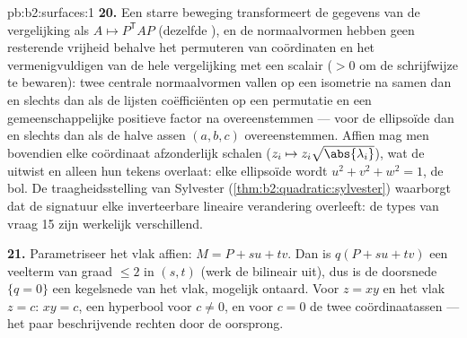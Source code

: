 \begin{solution}{pb:b2:surfaces:1}
\textbf{20.} Een starre beweging transformeert de gegevens van de
vergelijking als $A \mapsto P^{\mathsf T}\!AP$ (dezelfde
), en de normaalvormen hebben geen resterende vrijheid
behalve het permuteren van coördinaten en het vermenigvuldigen van
de hele vergelijking met een scalair ($> 0$ om de schrijfwijze te
bewaren): twee centrale normaalvormen vallen op een isometrie na
samen dan en slechts dan als de lijsten coëfficiënten op een
permutatie en een gemeenschappelijke positieve factor na
overeenstemmen --- voor de ellipsoïde dan en slechts dan als de
halve assen $(a, b, c)$ overeenstemmen. Affien mag men bovendien
elke coördinaat afzonderlijk schalen ($z_i \mapsto
z_i\sqrt{\abs{\lambda_i}}$), wat de  uitwist en alleen
hun tekens overlaat: elke ellipsoïde wordt $u^2 + v^2 + w^2 = 1$,
de bol. De traagheidsstelling van Sylvester
(\cref{thm:b2:quadratic:sylvester}) waarborgt dat de signatuur elke
inverteerbare lineaire verandering overleeft: de  types van
vraag 15 zijn werkelijk verschillend.

\textbf{21.} Parametriseer het vlak affien: $M = P + su + tv$. Dan
is $q(P + su + tv)$ een veelterm van graad $\leq 2$ in $(s, t)$
(werk de  bilineair uit), dus is de doorsnede $\{q
= 0\}$ een kegelsnede van het vlak, mogelijk ontaard. Voor $z = xy$
en het vlak $z = c$: $xy = c$, een hyperbool voor $c \neq 0$, en
voor $c = 0$ de twee coördinaatassen --- het paar beschrijvende
rechten door de oorsprong.


\end{solution}
